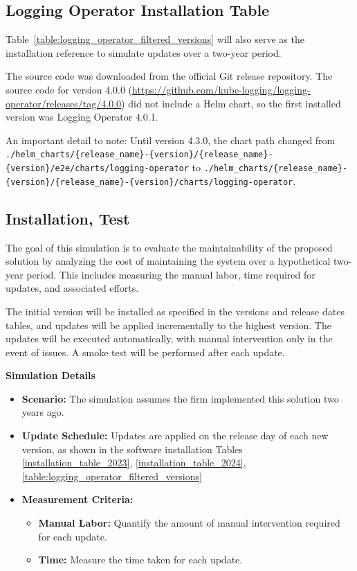 \documentclass[../main.tex]{subfiles}
\begin{document}
\subsection{Logging Operator Installation Table}

Table~\ref{table:logging_operator_filtered_versions} will also serve as the installation reference to simulate updates over a two-year period.

The source code was downloaded from the official Git release repository. The source code for version 4.0.0 (\url{https://github.com/kube-logging/logging-operator/releases/tag/4.0.0}) did not include a Helm chart, so the first installed version was Logging Operator 4.0.1.  

An important detail to note: Until version 4.3.0, the chart path changed from  
\texttt{./helm\_charts/\{release\_name\}-\{version\}/\{release\_name\}-\{version\}/e2e/charts/logging-operator}  
to  
\texttt{./helm\_charts/\{release\_name\}-\{version\}/\{release\_name\}-\{version\}/charts/logging-operator}.

\subsection{Installation, Test}

The goal of this simulation is to evaluate the maintainability of the proposed solution by analyzing the cost of maintaining the system over a hypothetical two-year period. This includes measuring the manual labor, time required for updates, and associated efforts.

The initial version will be installed as specified in the versions and release dates tables, and updates will be applied incrementally to the highest version. The updates will be executed automatically, with manual intervention only in the event of issues. A smoke test will be performed after each update.

\textbf{Simulation Details}

\begin{itemize}
    \item \textbf{Scenario:} The simulation assumes the firm implemented this solution two years ago.
    \item \textbf{Update Schedule:} Updates are applied on the release day of each new version, as shown in the software installation Tables \ref{installation_table_2023}, \ref{installation_table_2024}, \ref{table:logging_operator_filtered_versions}
    \item \textbf{Measurement Criteria:}
    \begin{itemize}
        \item \textbf{Manual Labor:} Quantify the amount of manual intervention required for each update.
        \item \textbf{Time:} Measure the time taken for each update.
    \end{itemize}
\end{itemize}
\end{document}
